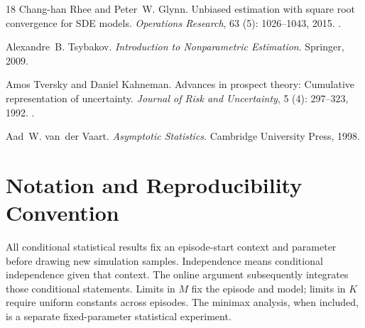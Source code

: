 \documentclass[11pt]{article}
\newcommand{\1}{\mathbf 1}
\theoremstyle{definition}
\begin{document}
\begin{thebibliography}{18}
Chang-han Rhee and Peter~W. Glynn.
\newblock Unbiased estimation with square root convergence for {SDE} models.
\newblock \emph{Operations Research}, 63 (5): 1026--1043,
  2015.
\newblock {}.

Alexandre~B. Tsybakov.
\newblock \emph{Introduction to Nonparametric Estimation}.
\newblock Springer, 2009.

Amos Tversky and Daniel Kahneman.
\newblock Advances in prospect theory: Cumulative representation of
  uncertainty.
\newblock \emph{Journal of Risk and Uncertainty}, 5 (4):
  297--323, 1992.
\newblock {}.

Aad~W. van~der Vaart.
\newblock \emph{Asymptotic Statistics}.
\newblock Cambridge University Press, 1998.

\end{thebibliography}

\clearpage
\appendix

\section{Notation and Reproducibility Convention}\label{app:notation}
All conditional statistical results fix an episode-start context and parameter before drawing new simulation samples. Independence means conditional independence given that context. The online argument subsequently integrates those conditional statements. Limits in $M$ fix the episode and model; limits in $K$ require uniform constants across episodes. The minimax analysis, when included, is a separate fixed-parameter statistical experiment.
\end{document}
